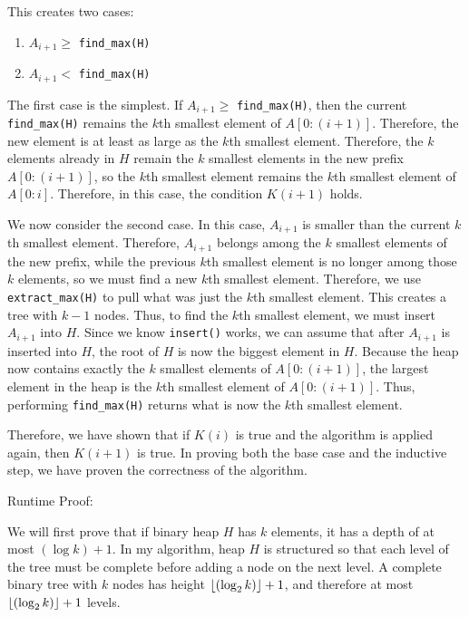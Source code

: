 \documentclass[11pt]{article}
\DeclarePairedDelimiter\floor{\lfloor}{\rfloor}
\begin{document}
\begin{enumerate}
This creates two cases:
\begin{enumerate}[label=\arabic*., noitemsep]
    \item $A_{i+1} \geq$ \verb|find_max(H)|
    \item $A_{i+1} <$ \verb|find_max(H)|
\end{enumerate}

The first case is the simplest. If $A_{i+1} \geq$ \verb|find_max(H)|, then the current \verb|find_max(H)| remains the $k$th smallest element of $A[0:(i+1)]$. 
Therefore, the new element is at least as large as the $k$th smallest element. Therefore, the $k$ elements already in $H$ remain the $k$ smallest elements 
in the new prefix $A[0:(i+1)]$, so the $k$th smallest element remains the $k$th smallest element of $A[0:i]$. 
Therefore, in this case, the condition $K(i+1)$ holds. 

We now consider the second case. In this case, $A_{i+1}$ is smaller than the current $k$th smallest element. 
Therefore, $A_{i+1}$ belongs among the $k$ smallest elements of the new prefix, while the previous $k$th smallest element is no longer among those $k$ elements, 
so we must find a new $k$th smallest element. Therefore, we use \verb|extract_max(H)| to pull what was just the $k$th smallest element. 
This creates a tree with $k-1$ nodes. Thus, to find the $k$th smallest element, we must insert $A_{i+1}$ into $H$. Since we know \verb|insert()| works, 
we can assume that after $A_{i+1}$ is inserted into $H$, the root of $H$ is now the biggest element in $H$. 
Because the heap now contains exactly the $k$ smallest elements of $A[0:(i+1)]$, the largest element in the heap is the $k$th smallest element of $A[0:(i+1)]$. 
Thus, performing \verb|find_max(H)| returns what is now the $k$th smallest element. 

Therefore, we have shown that if $K(i)$ is true and the algorithm is applied again, then $K(i+1)$ is true. 
In proving both the base case and the inductive step, we have proven the correctness of the algorithm.

\medbreak

Runtime Proof:

We will first prove that if binary heap $H$ has $k$ elements, it has a depth of at most $(\log k) + 1$. 
In my algorithm, heap $H$ is structured so that each level of the tree must be complete before adding a node on the next level. 
A complete binary tree with $k$ nodes has height $\floor{(\log_2 k)} + 1$, and therefore at most $\floor{(\log_2 k)} + 1$ levels.


\end{enumerate}
\end{document}
